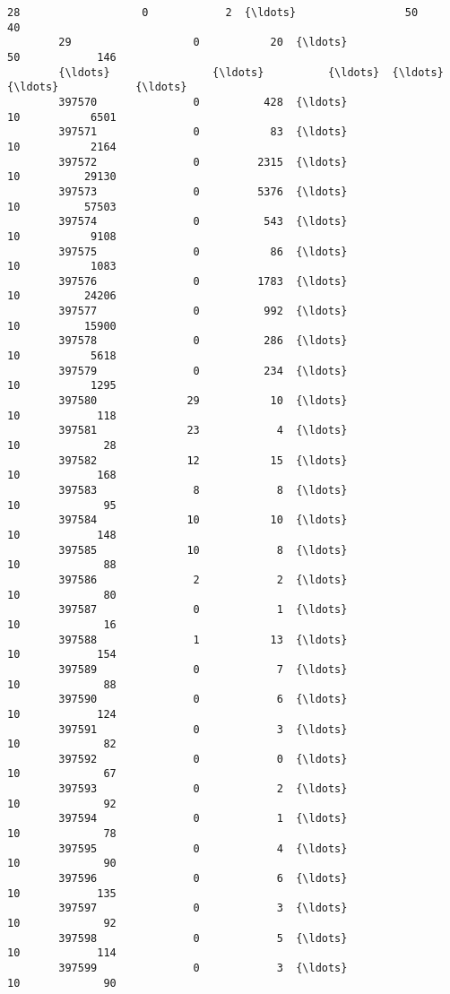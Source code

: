 \documentclass[11pt]{article}
\begin{document}
\begin{Verbatim}[commandchars=\\\{\}]
        28                   0            2  {\ldots}                 50             40   
        29                   0           20  {\ldots}                 50            146   
        {\ldots}                {\ldots}          {\ldots}  {\ldots}                {\ldots}            {\ldots}   
        397570               0          428  {\ldots}                 10           6501   
        397571               0           83  {\ldots}                 10           2164   
        397572               0         2315  {\ldots}                 10          29130   
        397573               0         5376  {\ldots}                 10          57503   
        397574               0          543  {\ldots}                 10           9108   
        397575               0           86  {\ldots}                 10           1083   
        397576               0         1783  {\ldots}                 10          24206   
        397577               0          992  {\ldots}                 10          15900   
        397578               0          286  {\ldots}                 10           5618   
        397579               0          234  {\ldots}                 10           1295   
        397580              29           10  {\ldots}                 10            118   
        397581              23            4  {\ldots}                 10             28   
        397582              12           15  {\ldots}                 10            168   
        397583               8            8  {\ldots}                 10             95   
        397584              10           10  {\ldots}                 10            148   
        397585              10            8  {\ldots}                 10             88   
        397586               2            2  {\ldots}                 10             80   
        397587               0            1  {\ldots}                 10             16   
        397588               1           13  {\ldots}                 10            154   
        397589               0            7  {\ldots}                 10             88   
        397590               0            6  {\ldots}                 10            124   
        397591               0            3  {\ldots}                 10             82   
        397592               0            0  {\ldots}                 10             67   
        397593               0            2  {\ldots}                 10             92   
        397594               0            1  {\ldots}                 10             78   
        397595               0            4  {\ldots}                 10             90   
        397596               0            6  {\ldots}                 10            135   
        397597               0            3  {\ldots}                 10             92   
        397598               0            5  {\ldots}                 10            114   
        397599               0            3  {\ldots}                 10             90   
        

\end{Verbatim}
\end{document}
